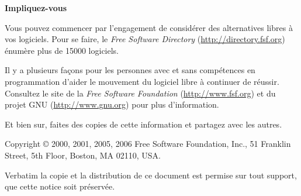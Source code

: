 \documentclass[12pt]{article}
\begin{document}

\begin{center}
{\Large\bf Impliquez-vous}
\end{center}

Vous pouvez commencer par l'engagement de considérer des alternatives libres à
vos logiciels. Pour se faire, le \textit{Free Software Directory}
(\url{http://directory.fsf.org}) énumère plus de 15000 logiciels.


Il y a plusieurs façons pour les personnes avec et sans compétences en
programmation d'aider le mouvement du logiciel libre à continuer de réussir.
Consultez le site de la \textit{Free Software Foundation}
(\url{http://www.fsf.org}) et du projet GNU (\url{http://www.gnu.org}) pour
plus d'information.

Et bien sur, faites des copies de cette information et partagez avec les
autres.



\vspace{0.3in}

{\small

\noindent Copyright \copyright\/ 2000, 2001, 2005, 2006 Free Software Foundation, Inc., 51
Franklin Street, 5th Floor, Boston, MA 02110, USA.

Verbatim la copie et la distribution de ce document est permise sur tout support,
que cette notice soit préservée.

}
\end{document}
